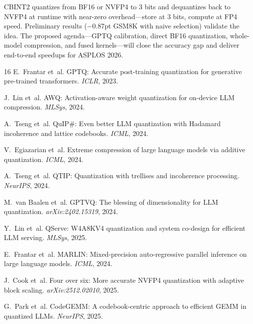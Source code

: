 \documentclass[11pt,a4paper]{article}
\begin{document}
\begin{sloppypar}
CBINT2 quantizes from BF16 or NVFP4 to 3 bits and dequantizes back to NVFP4 at runtime with near-zero overhead---store at 3 bits, compute at FP4 speed.
Preliminary results ($-$0.87pt GSM8K with naive selection) validate the idea.
The proposed agenda---GPTQ calibration, direct BF16 quantization, whole-model compression, and fused kernels---will close the accuracy gap and deliver end-to-end speedups for ASPLOS 2026.
\end{sloppypar}

\begin{thebibliography}{16}
E.~Frantar et~al. {GPTQ}: Accurate post-training quantization for generative pre-trained transformers. \emph{ICLR}, 2023.

J.~Lin et~al. {AWQ}: Activation-aware weight quantization for on-device {LLM} compression. \emph{MLSys}, 2024.

A.~Tseng et~al. {QuIP\#}: Even better {LLM} quantization with {Hadamard} incoherence and lattice codebooks. \emph{ICML}, 2024.

V.~Egiazarian et~al. Extreme compression of large language models via additive quantization. \emph{ICML}, 2024.

A.~Tseng et~al. {QTIP}: Quantization with trellises and incoherence processing. \emph{NeurIPS}, 2024.

M.~van Baalen et~al. {GPTVQ}: The blessing of dimensionality for {LLM} quantization. \emph{arXiv:2402.15319}, 2024.

Y.~Lin et~al. {QServe}: {W4A8KV4} quantization and system co-design for efficient {LLM} serving. \emph{MLSys}, 2025.

E.~Frantar et~al. {MARLIN}: Mixed-precision auto-regressive parallel inference on large language models. \emph{ICML}, 2024.

J.~Cook et~al. Four over six: More accurate {NVFP4} quantization with adaptive block scaling. \emph{arXiv:2512.02010}, 2025.

G.~Park et~al. {CodeGEMM}: A codebook-centric approach to efficient {GEMM} in quantized {LLMs}. \emph{NeurIPS}, 2025.


\end{thebibliography}
\end{document}
